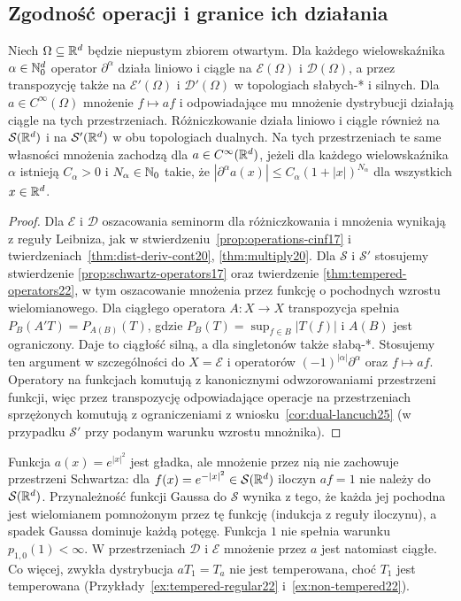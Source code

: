 \subsection{Zgodność operacji i granice ich działania}

\begin{stwierdzenie}
\label{prop:ops25}
Niech $\Omega\subseteq\mathbb R^d$ będzie niepustym zbiorem otwartym.
Dla każdego wielowskaźnika $\alpha\in\mathbb N_0^d$
operator $\partial^\alpha$ działa liniowo i ciągle na
$\mathcal E(\Omega)$ i $\mathcal D(\Omega)$, a przez
transpozycję także na $\mathcal E'(\Omega)$ i
$\mathcal D'(\Omega)$ w topologiach słabych-* i silnych.
Dla $a\in C^\infty(\Omega)$ mnożenie $f\mapsto af$
i odpowiadające mu mnożenie dystrybucji działają ciągle
na tych przestrzeniach.
Różniczkowanie działa liniowo i ciągle również na
$\mathcal S(\mathbb R^d)$ i na $\mathcal S'(\mathbb R^d)$ w obu
topologiach dualnych. Na tych przestrzeniach
te same własności mnożenia zachodzą dla
$a\in C^\infty(\mathbb R^d)$, jeżeli dla każdego
wielowskaźnika $\alpha$ istnieją $C_\alpha>0$ i
$N_\alpha\in\mathbb N_0$ takie, że
$|\partial^\alpha a(x)|\le C_\alpha(1+|x|)^{N_\alpha}$
dla wszystkich $x\in\mathbb R^d$.
\end{stwierdzenie}
\begin{proof}
Dla $\mathcal E$ i $\mathcal D$ oszacowania seminorm
dla różniczkowania i mnożenia wynikają z reguły Leibniza,
jak w stwierdzeniu~\ref{prop:operations-cinf17}
i twierdzeniach~\ref{thm:dist-deriv-cont20}, \ref{thm:multiply20}.
Dla $\mathcal S$ i $\mathcal S'$ stosujemy stwierdzenie
\ref{prop:schwartz-operators17} oraz twierdzenie
\ref{thm:tempered-operators22}, w tym oszacowanie
mnożenia przez funkcję o pochodnych wzrostu wielomianowego.
Dla ciągłego operatora $A:X\to X$ transpozycja spełnia
$P_B(A'T)=P_{A(B)}(T)$, gdzie
$P_B(T)=\sup_{f\in B}|T(f)|$ i $A(B)$ jest ograniczony.
Daje to ciągłość silną, a dla singletonów także słabą-*.
Stosujemy ten argument w szczególności do
$X=\mathcal E$ i operatorów $(-1)^{|\alpha|}\partial^\alpha$
oraz $f\mapsto af$. Operatory na funkcjach komutują
z kanonicznymi odwzorowaniami przestrzeni funkcji,
więc przez transpozycję odpowiadające operacje
na przestrzeniach sprzężonych komutują z ograniczeniami
z wniosku~\ref{cor:dual-lancuch25} (w przypadku $\mathcal S'$
przy podanym warunku wzrostu mnożnika).
\end{proof}

\begin{przyklad}
\label{ex:not-multiplier25}
Funkcja $a(x)=e^{|x|^2}$ jest gładka, ale mnożenie przez nią
nie zachowuje przestrzeni Schwartza: dla
$f(x)=e^{-|x|^2}\in\mathcal S(\mathbb R^d)$ iloczyn $af=1$
nie należy do $\mathcal S(\mathbb R^d)$. Przynależność funkcji Gaussa do $\mathcal S$ wynika
z tego, że każda jej pochodna jest wielomianem
pomnożonym przez tę funkcję (indukcja z reguły
iloczynu), a spadek Gaussa dominuje każdą potęgę.
Funkcja $1$ nie spełnia warunku $p_{1,0}(1)<\infty$.
W przestrzeniach $\mathcal D$ i $\mathcal E$
mnożenie przez $a$ jest natomiast ciągłe.
Co więcej, zwykła dystrybucja $aT_1=T_a$ nie jest
temperowana, choć $T_1$ jest temperowana
(Przykłady~\ref{ex:tempered-regular22}
i~\ref{ex:non-tempered22}).
\end{przyklad}

